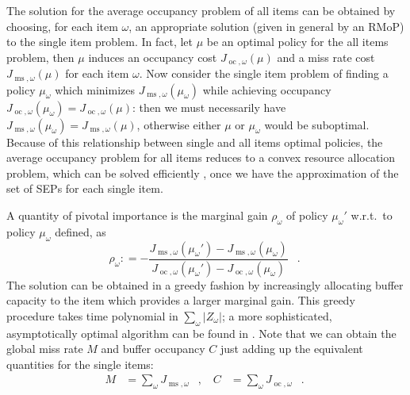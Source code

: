 \documentclass[11pt,a4paper]{article}
\DeclareMathOperator{\oc}{oc}
\DeclareMathOperator{\ms}{ms}
\DeclareMathOperator{\mf}{\enspace .}
\DeclareMathOperator{\mc}{\enspace ,}
\newcommand{\deq}{\mathrel{\mathop:}=}
\theoremstyle{definition}
\theoremstyle{remark}
\begin{document}
The solution for the average occupancy problem of all items can be obtained by
choosing, for each item $\omega$, an appropriate solution (given in general by
an RMoP) to the single item problem. In fact, let $\mu$ be an optimal policy for
the all items problem, then $\mu$ induces an occupancy cost
$J_{\oc,\omega}(\mu)$ and a miss rate cost $J_{\ms,\omega}(\mu)$ for each item
$\omega$. Now consider the single item problem of finding a policy $\mu_\omega$
which minimizes $J_{\ms,\omega}(\mu_\omega)$ while achieving occupancy
$J_{\oc,\omega}(\mu_\omega)=J_{\oc,\omega}(\mu)$: then we must necessarily have
$J_{\ms,\omega}(\mu_\omega)=J_{\ms,\omega}(\mu)$, otherwise either $\mu$ or
$\mu_\omega$ would be suboptimal.
Because of this relationship between single and all items optimal policies, the
average occupancy problem for all items reduces to a convex resource allocation
problem, which can be solved efficiently
\cite{StoneTW92,ThiebautSW92,FredericksonJ82}, once we have the approximation of
the set of SEPs for each single item.

A quantity of pivotal importance is the marginal gain $\rho_\omega$ of policy
$\mu_\omega'$ w.r.t.\ to policy $\mu_\omega$ defined, as
\begin{equation}
  \rho_\omega \deq -
  \frac{J_{\ms,\omega}(\mu_\omega')-J_{\ms,\omega}(\mu_\omega)}
  {J_{\oc,\omega}(\mu_\omega')-J_{\oc,\omega}(\mu_\omega)}
  \mf
\end{equation}
The solution can be obtained in a greedy fashion by increasingly allocating
buffer capacity to the item which provides a larger marginal gain. This greedy
procedure takes time polynomial in $\sum_\omega|Z_\omega|$; a more sophisticated,
asymptotically optimal algorithm can be found in \cite{FredericksonJ82}.  Note
that we can obtain the global miss rate $M$ and buffer occupancy $C$ just adding
up the equivalent quantities for the single items:
\begin{align}
  M &= \sum_\omega J_{\ms,\omega} \mc &
  C &= \sum_\omega J_{\oc,\omega} \mf
\end{align}
\end{document}
